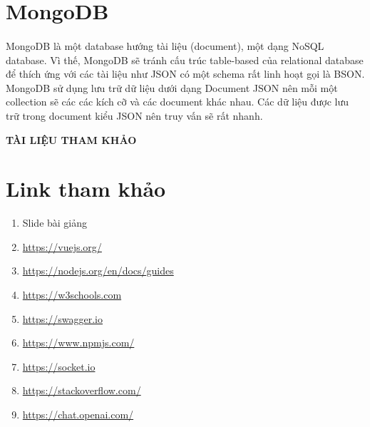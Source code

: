 \documentclass{report}
\begin{document}
\section{MongoDB}



\paragraph{}
MongoDB là một database hướng tài liệu (document), một dạng NoSQL database. Vì thế, MongoDB sẽ tránh cấu trúc table-based của relational database để thích ứng với các tài liệu như JSON có một schema rất linh hoạt gọi là BSON. MongoDB sử dụng lưu trữ dữ liệu dưới dạng Document JSON nên mỗi một collection sẽ các các kích cỡ và các document khác nhau. Các dữ liệu được lưu trữ trong document kiểu JSON nên truy vấn sẽ rất nhanh.
\FloatBarrier


\pagebreak



\begin{center}
	\setcounter{page}{1}
	\fontsize{16}{20}\selectfont
	\textbf{TÀI LIỆU THAM KHẢO\\} 
\end{center}
\fontsize{16}{15}\selectfont
\section*{Link tham khảo}
\begin{enumerate}
\fontsize{13}{15}\selectfont
    \item Slide bài giảng
    \item \url{https://vuejs.org/}
    \item \url{https://nodejs.org/en/docs/guides} 
    \item \url{https://w3schools.com}
    \item \url{https://swagger.io}
    \item \url{https://www.npmjs.com/}
    \item \url{https://socket.io}
    \item \url{https://stackoverflow.com/}
    \item \url{https://chat.openai.com/}
\end{enumerate}
\end{document}
